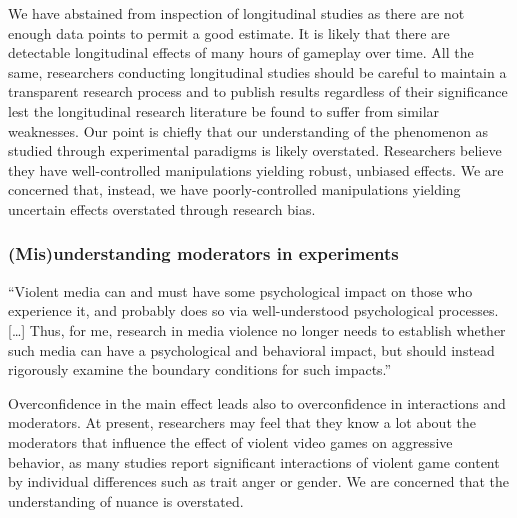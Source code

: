 \documentclass[man]{apa6}
\begin{document}
We have abstained from inspection of longitudinal studies as there are not enough data points to permit a good estimate. It is likely that there are detectable longitudinal effects of many hours of gameplay over time. All the same, researchers conducting longitudinal studies should be careful to maintain a transparent research process and to publish results regardless of their significance lest the longitudinal research literature be found to suffer from similar weaknesses. Our point is chiefly that our understanding of the phenomenon as studied through experimental paradigms is likely overstated. Researchers believe they have well-controlled manipulations yielding robust, unbiased effects. We are concerned that, instead, we have poorly-controlled manipulations yielding uncertain effects overstated through research bias.

\subsubsection{(Mis)understanding moderators in experiments}
\begin{displayquote}
``Violent media can and must have some psychological impact on those who experience it, and probably does so via well-understood psychological processes. [\ldots] Thus, for me, research in media violence no longer needs to establish whether such media can have a psychological and behavioral impact, but should instead rigorously examine the boundary conditions for such impacts.''  \citep[p. 62]{Warburton:2014}
\end{displayquote}

Overconfidence in the main effect leads also to overconfidence in interactions and moderators.  At present, researchers may feel that they know a lot about the moderators that influence the effect of violent video games on aggressive behavior, as many studies report significant interactions of violent game content by individual differences such as trait anger or gender. We are concerned that the understanding of nuance is overstated. 
\end{document}
